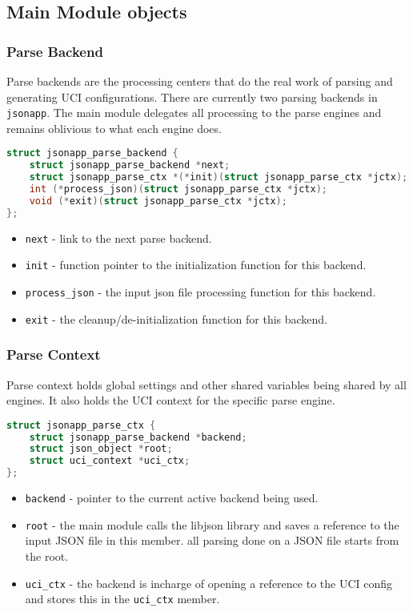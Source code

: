 \documentclass{article}
\begin{document}
\subsection{Main Module objects}

\subsubsection{Parse Backend}

Parse backends are the processing centers that do the real work of parsing and generating UCI configurations. There are currently two parsing backends in \verb|jsonapp|. The main module delegates all processing to the parse engines and remains oblivious to what each engine does.

\begin{lstlisting}[language=c]
struct jsonapp_parse_backend {
	struct jsonapp_parse_backend *next;
	struct jsonapp_parse_ctx *(*init)(struct jsonapp_parse_ctx *jctx);
	int (*process_json)(struct jsonapp_parse_ctx *jctx);
	void (*exit)(struct jsonapp_parse_ctx *jctx);
};
\end{lstlisting}

\begin{itemize}
	\item \verb|next| - link to the next parse backend.
	\item \verb|init| - function pointer to the initialization function for this backend.
	\item \verb|process_json| - the input json file processing function for this backend.
	\item \verb|exit| - the cleanup/de-initialization function for this backend.
\end{itemize}

\subsubsection{Parse Context}
Parse context holds global settings and other shared variables being shared by all engines. It also holds the UCI context for the specific parse engine.

\begin{lstlisting}[language=c]
struct jsonapp_parse_ctx {
	struct jsonapp_parse_backend *backend;
	struct json_object *root;
	struct uci_context *uci_ctx;
};
\end{lstlisting}

\begin{itemize}
	\item \verb|backend| - pointer to the current active backend being used.
	\item \verb|root| - the main module calls the libjson library and saves a reference to the input JSON file in this member. all parsing done on a JSON file starts from the root.
	\item \verb|uci_ctx| - the backend is incharge of opening a reference to the UCI config 
	and stores this in the \verb|uci_ctx| member.
\end{itemize}
\end{document}
